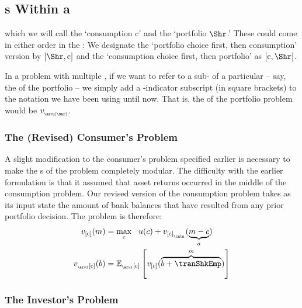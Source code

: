 \documentclass[titlepage, headings=optiontotocandhead]{econtex}
\begin{document}
\hypertarget{stages-within-a-period}{}
\subsection{{\Stg}s Within a {\Interval}}\label{subsec:stageswithin}

which we will call the `consumption {\stg} $\mathrm{c}$' and the `portfolio {\stg} $\Shr$.'  These could come in either order in the {\interval}: We designate the `portfolio choice first, then consumption' version by $[\Shr,\mathrm{c}]$ and the `consumption choice first, then portfolio' as $[\mathrm{c},\Shr]$.

In a problem with multiple {\stgs}, if we want to refer to a sub-{\move} of a particular {\stg} -- say, the {\Arrival} {\stg} of the portfolio {\stg} -- we simply add a {\stg}-indicator subscript (in square brackets) to the notation we have been using until now.  That is, the {\Arrival} {\stg} of the portfolio problem would be $v_{_\arvl[\Shr]}$.

\hypertarget{revised-consumers-problem}{}
\subsubsection{The (Revised) Consumer's Problem}\label{subsubsec:revised-consumers-problem}

A slight modification to the consumer's problem specified earlier is necessary to make the {\stg}s of the problem completely modular.  The difficulty with the earlier formulation is that it assumed that asset returns occurred in the middle {\move} of the consumption problem.  Our revised version of the consumption problem takes as its input state the amount of bank balances that have resulted from any prior portfolio decision.  The problem is therefore:
  \begin{equation}\begin{gathered}\begin{aligned}
 v_{[\mathrm{c}]}(m) & =  \max_{c} ~~ u(c)+  v_{[\mathrm{c}]_{_\cntn}}(\underbrace{m-c}_{a})             
\\    v_{_\arvl[\mathrm{c}]}(b) & = {\mathbb{E}}_{_\arvl[\mathrm{c}]}\left[v_{[c]}(\overbrace{b+\tranShkEmp}^{m})\right] \label{eq:vBalances}
      \end{aligned}\end{gathered}\end{equation}


\hypertarget{subsubsec:investors-problem}{}
\subsubsection{The Investor's Problem}\label{subsubsec:investors-problem}
\end{document}
